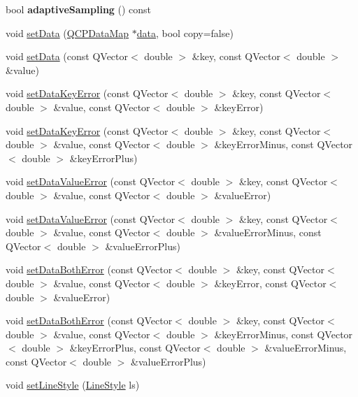 \begin{DoxyCompactItemize}
bool {\bfseries adaptive\+Sampling} () const
\item 
void \hyperlink{class_q_c_p_graph_a1df2fd710545c8ba3b2c99a39a27bf8b}{set\+Data} (\hyperlink{qcustomplot_8h_a84a9c4a4c2216ccfdcb5f3067cda76e3}{Q\+C\+P\+Data\+Map} $\ast$\hyperlink{class_q_c_p_graph_acde1c0d1f6a817930489548396e6b3e6}{data}, bool copy=false)
\item 
void \hyperlink{class_q_c_p_graph_a4c55d8ac13bfa42c8c93747820891a76}{set\+Data} (const Q\+Vector$<$ double $>$ \&key, const Q\+Vector$<$ double $>$ \&value)
\item 
void \hyperlink{class_q_c_p_graph_abce9f07c0d722bc3e4fa7bd73c7e5dfa}{set\+Data\+Key\+Error} (const Q\+Vector$<$ double $>$ \&key, const Q\+Vector$<$ double $>$ \&value, const Q\+Vector$<$ double $>$ \&key\+Error)
\item 
void \hyperlink{class_q_c_p_graph_ac15c749c5fedf740d5692c6fe67143b8}{set\+Data\+Key\+Error} (const Q\+Vector$<$ double $>$ \&key, const Q\+Vector$<$ double $>$ \&value, const Q\+Vector$<$ double $>$ \&key\+Error\+Minus, const Q\+Vector$<$ double $>$ \&key\+Error\+Plus)
\item 
void \hyperlink{class_q_c_p_graph_acba6296eadcb36b93267628b8dae3de5}{set\+Data\+Value\+Error} (const Q\+Vector$<$ double $>$ \&key, const Q\+Vector$<$ double $>$ \&value, const Q\+Vector$<$ double $>$ \&value\+Error)
\item 
void \hyperlink{class_q_c_p_graph_a3afbfd7222d739351c69387904776f93}{set\+Data\+Value\+Error} (const Q\+Vector$<$ double $>$ \&key, const Q\+Vector$<$ double $>$ \&value, const Q\+Vector$<$ double $>$ \&value\+Error\+Minus, const Q\+Vector$<$ double $>$ \&value\+Error\+Plus)
\item 
void \hyperlink{class_q_c_p_graph_a873fe46bdb20be5710428e474ade8908}{set\+Data\+Both\+Error} (const Q\+Vector$<$ double $>$ \&key, const Q\+Vector$<$ double $>$ \&value, const Q\+Vector$<$ double $>$ \&key\+Error, const Q\+Vector$<$ double $>$ \&value\+Error)
\item 
void \hyperlink{class_q_c_p_graph_abb75736ecdbf6e6a7501e1da64fb18cf}{set\+Data\+Both\+Error} (const Q\+Vector$<$ double $>$ \&key, const Q\+Vector$<$ double $>$ \&value, const Q\+Vector$<$ double $>$ \&key\+Error\+Minus, const Q\+Vector$<$ double $>$ \&key\+Error\+Plus, const Q\+Vector$<$ double $>$ \&value\+Error\+Minus, const Q\+Vector$<$ double $>$ \&value\+Error\+Plus)
\item 
void \hyperlink{class_q_c_p_graph_a513fecccff5b2a50ce53f665338c60ff}{set\+Line\+Style} (\hyperlink{class_q_c_p_graph_ad60175cd9b5cac937c5ee685c32c0859}{Line\+Style} ls)

\end{DoxyCompactItemize}
